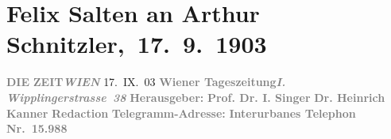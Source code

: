 

         
         \renewcommand{\erwaehntePersonen}{Personen: Heinrich Kanner, Ottilie Salten, Olga Schnitzler, Heinrich Schnitzler, Isidor Singer}
         \renewcommand{\erwaehnteInstitutionen}{Institutionen: Die Zeit}
         \renewcommand{\erwaehnteOrte}{Orte: Edmund-Weiß-Gasse 7, Frankgasse 1, Wien, Wipplingerstraße, XVIII., Währing}
         \renewcommand{\erwaehnteWerke}{}
               \section[ Felix Salten an Arthur Schnitzler, 17. 9. 1903]{ Felix Salten an Arthur Schnitzler, 17. 9. 1903}\nopagebreak{}\rehead{ }\begin{ledgroupsized}[t]{13cm}\normalsize\beginnumbering \toendnotes[C]{\smallbreak\pagebreak[2]} 
\toendnotes[C]{\smallbreak}\pstart
           \noindent{}{\pb}\textcolor{gray}{\textbf{DIE}}\pend
           \pstart
           \textcolor{gray}{\textbf{ZEIT}}\hfill \textcolor{gray}{\textbf{\emph{WIEN}}}{ }17. IX. 03\pend
           \pstart
           \textcolor{gray}{\textbf{Wiener Tageszeitung}}\hfill \textcolor{gray}{\textbf{\emph{I. Wipplingerstrasse 38}}}\pend
           \pstart
           \textcolor{gray}{\textbf{Herausgeber:}}\pend
           \pstart
           \textcolor{gray}{\textbf{\textbf{Prof. Dr. I. Singer}}}\pend
           \pstart
           \textcolor{gray}{\textbf{\textbf{Dr. Heinrich Kanner}}}\pend
           \pstart
           \textcolor{gray}{\textbf{\textbf{Redaction}}}\pend
           \pstart
           \textcolor{gray}{\textbf{Telegramm-Adresse: \so{,}{ }}}\pend
           \pstart
           \textcolor{gray}{\textbf{Interurbanes Telephon Nr. 15.988}}\pend

\end{ledgroupsized}
